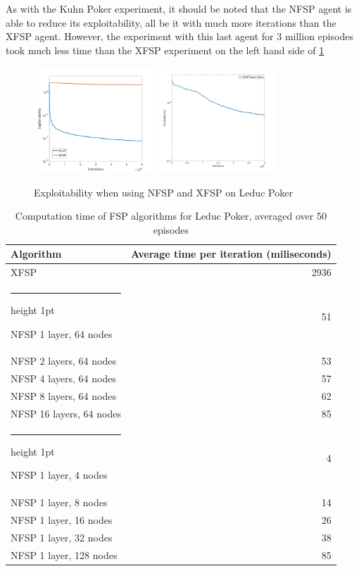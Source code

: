 \documentclass[10pt,a4paper]{article}
\makeatletter
\newcommand{\thickhline}{%
    \noalign {\ifnum 0=`}\fi \hrule height 1pt
    \futurelet \reserved@a \@xhline
}
\makeatother
\begin{document}
As with the Kuhn Poker experiment, it should be noted that the NFSP agent is able to reduce its exploitability, all be it with much more iterations than the XFSP agent. However, the experiment with this last agent for 3 million episodes took much less time than the XFSP experiment on the left hand side of \ref{fig:xfsp_nfsp_leduc}

\begin{center}
	\begin{figure}[h]
	\centering
	\label{fig:xfsp_nfsp_leduc}
	\includegraphics[width=0.4\textwidth]{Figures/xfsp_nfsp_leduc.png}
	\includegraphics[width=0.4\textwidth]{Figures/leduc_full_run.jpg}
	\caption{Exploitability when using NFSP and XFSP on Leduc Poker}
	\end{figure}
	\end{center}

\begin{table}[h]
\begin{center}
\begin{tabular}{|l|r|}
\hline 
Algorithm & Average time per iteration (miliseconds) \\\hline 
XFSP & 2936 \\ 
\thickhline 
NFSP 1 layer, 64 nodes & 51 \\ 
\hline 
NFSP 2 layers, 64 nodes  & 53 \\ 
\hline 
NFSP 4 layers, 64 nodes & 57 \\ 
\hline 
NFSP 8 layers, 64 nodes & 62 \\ 
\hline 
NFSP 16 layers, 64 nodes & 85 \\ 
\thickhline
NFSP 1 layer, 4 nodes & 4 \\ 
\hline 
NFSP 1 layer, 8 nodes & 14 \\ 
\hline 
NFSP 1 layer, 16 nodes & 26 \\ 
\hline 
NFSP 1 layer, 32 nodes & 38 \\ 
\hline 
NFSP 1 layer, 128 nodes & 85 \\ 
\hline 
\end{tabular}
\caption{Computation time of FSP algorithms for Leduc Poker, averaged over 50 episodes}
\label{tab:fsp_leduc}
\end{center}
\end{table} 
\end{document}
